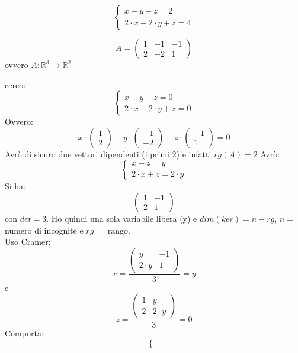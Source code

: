 \documentclass[a4paper,12pt, oneside]{book}
\begin{document}
	\begin{esempio}
		$$\begin{cases}
				x-y-z=2 \\
				2\cdot x-2\cdot y +z =4
			\end{cases}$$

		$$
			A=\left(\begin{matrix}
					1 & -1 & -1 \\
					2 & -2 & 1
				\end{matrix}\right)
		$$
		ovvero $A:\mathbb{R}^3\rightarrow \mathbb{R}^2$

		cerco:
		$$\begin{cases}
				x-y-z=0 \\
				2\cdot x-2\cdot y +z =0
			\end{cases}$$
		Ovvero:
		$$
			x\cdot\left(\begin{matrix}
					1 \\
					2
				\end{matrix}\right)+y\cdot\left(\begin{matrix}
					-1 \\
					-2
				\end{matrix}\right)+z\cdot\left(\begin{matrix}
					-1 \\
					1
				\end{matrix}\right)=0
		$$
		Avrò di sicuro due vettori dipendenti (i primi 2) e infatti $rg(A)=2$
		Avrò:
		$$\begin{cases}
				x-z=y \\
				2\cdot x+z=2\cdot y
			\end{cases}
		$$
		\newpage
		Si ha:
		$$
			\left(\begin{matrix}
					1 & -1 \\
					2 & 1
				\end{matrix}\right)
		$$
		con $det=3$. Ho quindi una sola variabile libera (y) e $dim(ker)=n-rg$, $n=$ numero di incognite e $rg=$ rango.\\
		Uso Cramer:
		$$
			x=\frac{\left(\begin{matrix}
					y        & -1 \\
					2\cdot y & 1
				\end{matrix}\right)}{3}=y
		$$
		e
		$$
			z=\frac{\left(\begin{matrix}
					1 & y        \\
					2 & 2\cdot y
				\end{matrix}\right)}{3}=0
		$$
		Comporta:
		$$\begin{cases}

\end{cases}$$
\end{esempio}
\end{document}
